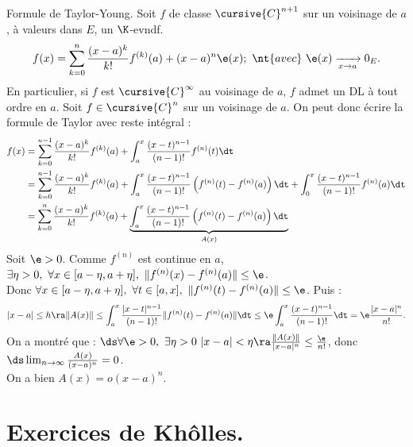 \documentclass[11pt]{article}
\begin{document}
\vspace*{-0.7cm}

\begin{thm}{Formule de Taylor-Young.}{}
    Soit $f$ de classe $\cursive{C}^{n+1}$ sur un voisinage de $a$, à valeurs dans $E$, un $\K$-evndf.
    \begin{equation*}
        f(x) = \sum_{k=0}^n\frac{(x-a)^k}{k!}f^{(k)}(a) + (x-a)^n\e(x); ~ \nt{avec} ~ \e(x) \xrightarrow[x\to a]{} 0_E.
    \end{equation*}
    En particulier, si $f$ est $\cursive{C}^{\infty}$ au voisinage de $a$, $f$ admet un DL à tout ordre en $a$.
    \tcblower
    Soit $f\in\cursive{C}^n$ sur un voisinage de $a$. On peut donc écrire la formule de Taylor avec reste intégral :
    \begin{align*}
        f(x) &= \sum_{k=0}^{n-1}\frac{(x-a)^k}{k!}f^{(k)}(a) + \int_a^x\frac{(x-t)^{n-1}}{(n-1)!}f^{(n)}(t)\dt\\
        &= \sum_{k=0}^{n-1}\frac{(x-a)^k}{k!}f^{(k)}(a) + \int_a^x \frac{(x-t)^{n-1}}{(n-1)!}\left( f^{(n)}(t) - f^{(n)}(a) \right)\dt + \int_0^x \frac{(x-t)^{n-1}}{(n-1)!}f^{(n)}(a)\dt\\
        &= \sum_{k=0}^{n}\frac{(x-a)^k}{k!}f^{(k)}(a) + \underbrace{\int_a^x\frac{(x-t)^{n-1}}{(n-1)!}\left( f^{(n)}(t) - f^{(n)}(a) \right)\dt}_{A(x)}
    \end{align*}
    Soit $\e>0$. Comme $f^{(n)}$ est continue en $a$, $\exists \eta > 0, ~ \forall x \in [a-\eta,a+\eta], ~ \|f^{(n)}(x)-f^{(n)}(a)\| \leq \e$.\\
    Donc $\forall x \in [a-\eta,a+\eta], ~ \forall t \in [a,x], ~ \|f^{(n)}(t) - f^{(n)}(a)\|\leq\e$. Puis :
    \begin{equation*}
        |x-a| \leq h \ra \|A(x)\| \leq \int_a^x \frac{|x-t|^{n-1}}{(n-1)!}\|f^{(n)}(t) - f^{(n)}(a)\|\dt\leq \e\int_a^x\frac{(x-t)^{n-1}}{(n-1)!}\dt = \e\frac{|x-a|^n}{n!}.
    \end{equation*}
    On a montré que : $\ds \forall \e > 0, ~ \exists \eta > 0 ~ |x-a|<\eta \ra \frac{\|A(x)\|}{|x-a|^n} \leq \frac{\e}{n!}$, donc $\ds \lim_{n\to\infty}\frac{A(x)}{(x-a)^n}=0$.\\
    On a bien $A(x)=o(x-a)^n$.
\end{thm}

\section{Exercices de Khôlles.}

\renewcommand*{\H}{\cursive{H}}
\renewcommand*{\N}{\cursive{N}}
\end{document}
